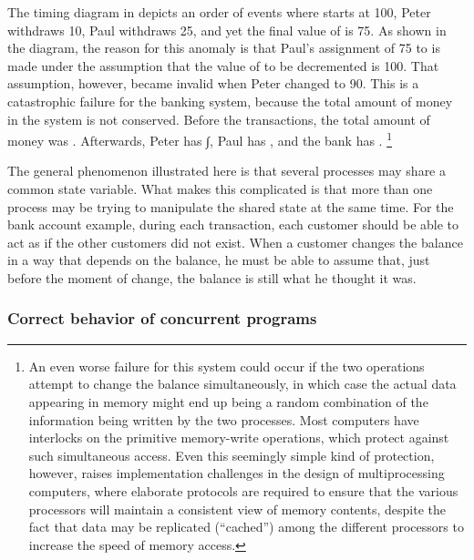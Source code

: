 The timing diagram in  depicts an order of events where  starts at 100, Peter withdraws 10, Paul withdraws 25, and yet the final value of  is 75.
As shown in the diagram, the reason for this anomaly is that Paul’s assignment of 75 to  is made under the assumption that the value of  to be decremented is 100.
That assumption, however, became invalid when Peter changed  to 90.
This is a catastrophic failure for the banking system, because the total amount of money in the system is not conserved.
Before the transactions, the total amount of money was .
Afterwards, Peter has ∫, Paul has , and the bank has .%
\footnote{
	An even worse failure for this system could occur if the two  operations attempt to change the balance simultaneously, in which case the actual data appearing in memory might end up being a random combination of the information being written by the two processes.
	Most computers have interlocks on the primitive memory-write operations, which protect against such simultaneous access.
	Even this seemingly simple kind of protection, however, raises implementation challenges in the design of multiprocessing computers, where elaborate  protocols are required to ensure that the various processors will maintain a consistent view of memory contents, despite the fact that data may be replicated (“cached”) among the different processors to increase the speed of memory access.
}

The general phenomenon illustrated here is that several processes may share a common state variable.
What makes this complicated is that more than one process may be trying to manipulate the shared state at the same time.
For the bank account example, during each transaction, each customer should be able to act as if the other customers did not exist.
When a customer changes the balance in a way that depends on the balance, he must be able to assume that, just before the moment of change, the balance is still what he thought it was.



\subsubsection*{Correct behavior of concurrent programs}

